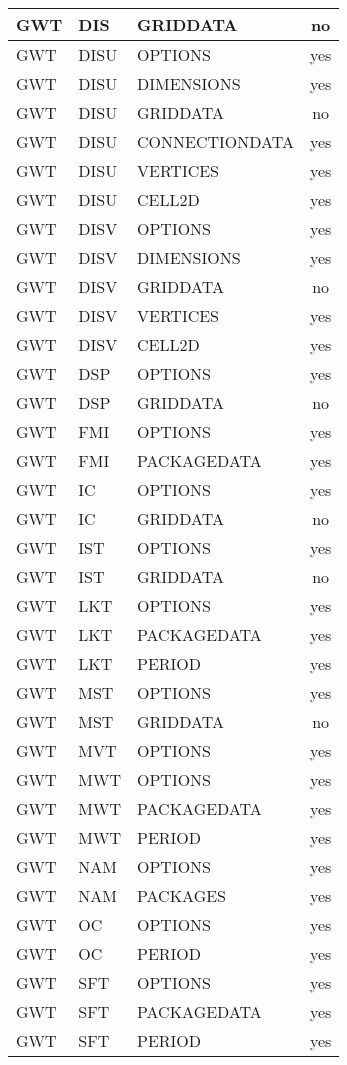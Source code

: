 \begin{longtable}{p{1.5cm} p{1.5cm} p{3cm} c}
GWT & DIS & GRIDDATA & no \\ 
\hline
GWT & DISU & OPTIONS & yes \\ 
GWT & DISU & DIMENSIONS & yes \\ 
GWT & DISU & GRIDDATA & no \\ 
GWT & DISU & CONNECTIONDATA & yes \\ 
GWT & DISU & VERTICES & yes \\ 
GWT & DISU & CELL2D & yes \\ 
\hline
GWT & DISV & OPTIONS & yes \\ 
GWT & DISV & DIMENSIONS & yes \\ 
GWT & DISV & GRIDDATA & no \\ 
GWT & DISV & VERTICES & yes \\ 
GWT & DISV & CELL2D & yes \\ 
\hline
GWT & DSP & OPTIONS & yes \\ 
GWT & DSP & GRIDDATA & no \\ 
\hline
GWT & FMI & OPTIONS & yes \\ 
GWT & FMI & PACKAGEDATA & yes \\ 
\hline
GWT & IC & OPTIONS & yes \\ 
GWT & IC & GRIDDATA & no \\ 
\hline
GWT & IST & OPTIONS & yes \\ 
GWT & IST & GRIDDATA & no \\ 
\hline
GWT & LKT & OPTIONS & yes \\ 
GWT & LKT & PACKAGEDATA & yes \\ 
GWT & LKT & PERIOD & yes \\ 
\hline
GWT & MST & OPTIONS & yes \\ 
GWT & MST & GRIDDATA & no \\ 
\hline
GWT & MVT & OPTIONS & yes \\ 
\hline
GWT & MWT & OPTIONS & yes \\ 
GWT & MWT & PACKAGEDATA & yes \\ 
GWT & MWT & PERIOD & yes \\ 
\hline
GWT & NAM & OPTIONS & yes \\ 
GWT & NAM & PACKAGES & yes \\ 
\hline
GWT & OC & OPTIONS & yes \\ 
GWT & OC & PERIOD & yes \\ 
\hline
GWT & SFT & OPTIONS & yes \\ 
GWT & SFT & PACKAGEDATA & yes \\ 
GWT & SFT & PERIOD & yes \\ 

\end{longtable}
